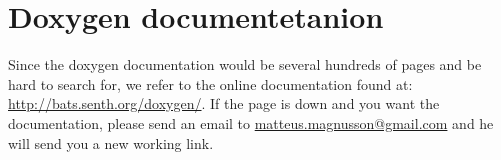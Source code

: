 \chapter{Doxygen documentetanion}
\label{sec:doxygen}
Since the doxygen documentation would be several hundreds of pages and be hard to search for, we refer to the online documentation found at: \url{http://bats.senth.org/doxygen/}. If the page is down and you want the documentation, please send an email to \href{mailto:matteus.magnusson@gmail.com}{matteus.magnusson@gmail.com} and he will send you a new working link.